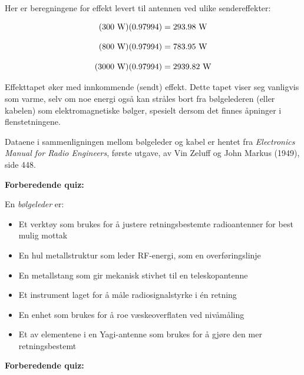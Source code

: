 \vskip 10pt

Her er beregningene for effekt levert til antennen ved ulike sendereffekter:

$$(300 \hbox{ W}) (0.97994) = 293.98 \hbox{ W}$$

$$(800 \hbox{ W}) (0.97994) = 783.95 \hbox{ W}$$

$$(3000 \hbox{ W}) (0.97994) = 2939.82 \hbox{ W}$$

\vskip 10pt

Effekttapet øker med innkommende (sendt) effekt. Dette tapet viser seg vanligvis som varme, selv om noe energi også kan stråles bort fra bølgelederen (eller kabelen) som elektromagnetiske bølger, spesielt dersom det finnes åpninger i flenstetningene.

\vskip 10pt

Dataene i sammenligningen mellom bølgeleder og kabel er hentet fra {\it Electronics Manual for Radio Engineers}, første utgave, av Vin Zeluff og John Markus (1949), side 448.

















\vfil \eject

\noindent
{\bf Forberedende quiz:}

En {\it bølgeleder} er:

\begin{itemize}
\item{} Et verktøy som brukes for å justere retningsbestemte radioantenner for best mulig mottak
\vskip 5pt 
\item{} En hul metallstruktur som leder RF-energi, som en overføringslinje
\vskip 5pt 
\item{} En metallstang som gir mekanisk stivhet til en teleskopantenne
\vskip 5pt 
\item{} Et instrument laget for å måle radiosignalstyrke i én retning
\vskip 5pt 
\item{} En enhet som brukes for å roe væskeoverflaten ved nivåmåling
\vskip 5pt 
\item{} Et av elementene i en Yagi-antenne som brukes for å gjøre den mer retningsbestemt
\end{itemize}


\vfil \eject

\noindent
{\bf Forberedende quiz:}

